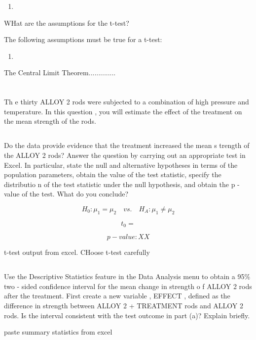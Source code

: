\documentclass[letterpaper]{article}
\begin{document}
\begin{enumerate}
 \item
\end{enumerate}

WHat are the assumptions for the t-test?

The following assumptions must be true for a t-test:
\begin{enumerate}
 \item
\end{enumerate}
The Central Limit Theorem..............

\section{}%
Th e  thirty  ALLOY  2  rods  were  subjected  to  a  combination  of  high
pressure  and  temperature.  In  this  question , you will estimate the effect
of the treatment on the mean strength of the rods.

\subsection{}%
Do the data provide evidence that the treatment increased the mean s trength of
the ALLOY 2  rods? Answer the question by carrying out an appropriate test in
Excel.  In particular, state  the null  and alternative hypotheses in terms of
the population parameters, obtain the value of the test  statistic,  specify the
distributio n of the test statistic under the null hypothesis, and obtain the  p
- value of the test.  What do you conclude?

$$H_0: \mu_1 = \mu_2  \quad vs. \quad H_A: \mu_1 \neq \mu_2  $$

$$t_0 =$$

$$ {p-value}: XX $$

t-test output from excel. CHoose t-test carefully

\subsection{}%
Use the  Descriptive Statistics feature in  the  Data Analysis menu to obtain a
95\%  two - sided  confidence interval for the mean change in strength o f ALLOY
2 rods after the treatment.   First create a new variable , EFFECT , defined as
the difference in strength between ALLOY 2 + TREATMENT rods and ALLOY 2 rods. Is
the interval consistent with the  test  outcome in part  (a)? Explain briefly.

paste summary statistics from excel
\end{document}

